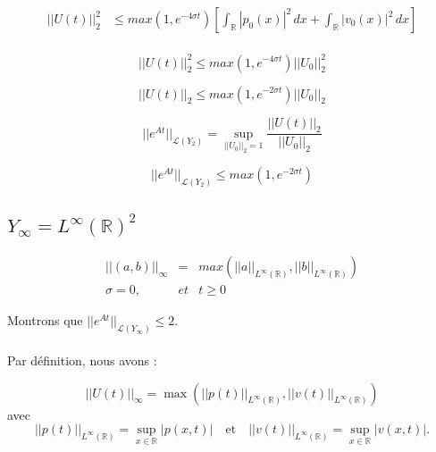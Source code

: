 \documentclass[a4paper,11pt]{article}
\begin{document}
\begin{equation*}
\begin{split}
    ||U(t)||^{2}_{2} & \le max(1, e^{-4\sigma t}) \left[ \int_{\mathbb{R}}|p_0(x)|^{2} \,dx + \int_{\mathbb{R}} |v_0(x)|^{2} \,dx \right] \\
\end{split}
\end{equation*}


\begin{equation*}
    ||U(t)||^{2}_{2} \le max(1, e^{-4\sigma t}) ||U_{0}||^{2}_{2}
\end{equation*}

\begin{equation*}
    ||U(t)||_{2} \le max(1, e^{-2\sigma t}) ||U_{0}||_{2}
\end{equation*}

\begin{equation*}
||e^{At}||_{\mathcal{L}(Y_{2})} = \sup_{||U_{0}||_{2} = 1}\frac{||U(t)||_{2}}{||U_{0}||_{2}}
\end{equation*}

\begin{equation*}
    ||e^{At}||_{\mathcal{L}(Y_{2})} \le max(1, e^{-2\sigma t})
\end{equation*}


\subsection{\( Y_{\infty} = L^{\infty}(\mathbb{R})^{2} \)}

\begin{equation*}
\begin{array}{rcl}
    ||(a,b)||_{\infty} &=& max(||a||_{L^{\infty}(\mathbb{R})}, ||b||_{L^{\infty}(\mathbb{R})}) \\
    \sigma = 0, & et & t\ge 0
\end{array}
\end{equation*}

Montrons que $||e^{At}||_{\mathcal{L}(Y_{\infty})} \leq 2$.\\ \\
Par d\'efinition, nous avons :

\begin{displaymath}
    ||U(t)||_{\infty}=\max(||p(t)||_{L^{\infty}(\mathbb{R})},||v(t)||_{L^{\infty}(\mathbb{R})})
\end{displaymath}
avec
\begin{displaymath}
    ||p(t)||_{L^{\infty}(\mathbb{R})}=\sup_{x\in \mathbb{R}}|p(x,t)| \quad \mbox{et} \quad ||v(t)||_{L^{\infty}(\mathbb{R})}=\sup_{x\in \mathbb{R}}|v(x,t)|.
\end{displaymath}
\end{document}
